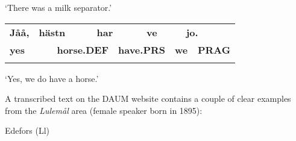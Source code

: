 \begin{styleTranslation}
‘There was a milk separator.’ 

\end{styleTranslation}

\begin{tabular}{llllllllll}
\lsptoprule
{\bfseries Jåå,} & \multicolumn{2}{l}{{\bfseries hästn}

} & \multicolumn{2}{l}{{\bfseries har}

} & \multicolumn{2}{l}{{\bfseries ve}

} & \multicolumn{2}{l}{{\bfseries jo.}

} & \\
\multicolumn{2}{l}{{\bfseries yes}

} & \multicolumn{2}{l}{{\bfseries horse.DEF}

} & \multicolumn{2}{l}{{\bfseries have.PRS}

} & \multicolumn{2}{l}{{\bfseries we}

} & \multicolumn{2}{l}{{\bfseries PRAG}

}\\
\lspbottomrule
\end{tabular}

\begin{styleTranslation}
‘Yes, we do have a horse.’ 

\end{styleTranslation}

\begin{styleBodyTextFirst}
A transcribed text on the DAUM website contains a couple of clear examples from the \textit{Lulemål} area (female speaker born in 1895):

\end{styleBodyTextFirst}


\begin{listWWNumileveli}
\item 

\begin{styleExample}
Edefors (Ll)

\end{styleExample}

\end{listWWNumileveli}

